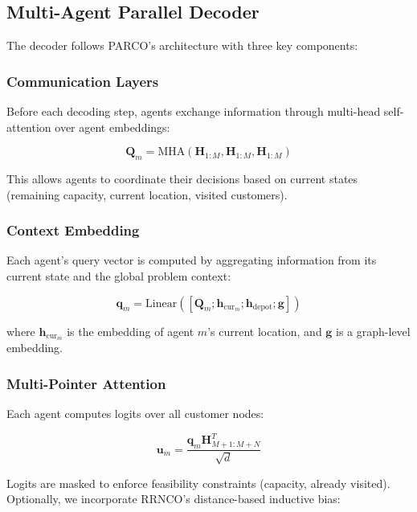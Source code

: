 \documentclass[lettersize,journal]{IEEEtran}
\begin{document}
\subsection{Multi-Agent Parallel Decoder}

The decoder follows PARCO's architecture with three key components:

\subsubsection{Communication Layers}

Before each decoding step, agents exchange information through multi-head self-attention over agent embeddings:

\begin{equation}
\mathbf{Q}_m = \text{MHA}(\mathbf{H}_{1:M}, \mathbf{H}_{1:M}, \mathbf{H}_{1:M})
\end{equation}

This allows agents to coordinate their decisions based on current states (remaining capacity, current location, visited customers).

\subsubsection{Context Embedding}

Each agent's query vector is computed by aggregating information from its current state and the global problem context:

\begin{equation}
\mathbf{q}_m = \text{Linear}([\mathbf{Q}_m; \mathbf{h}_{\text{cur}_m}; \mathbf{h}_{\text{depot}}; \mathbf{g}])
\end{equation}

where $\mathbf{h}_{\text{cur}_m}$ is the embedding of agent $m$'s current location, and $\mathbf{g}$ is a graph-level embedding.

\subsubsection{Multi-Pointer Attention}

Each agent computes logits over all customer nodes:

\begin{equation}
\mathbf{u}_m = \frac{\mathbf{q}_m \mathbf{H}_{M+1:M+N}^T}{\sqrt{d}}
\end{equation}

Logits are masked to enforce feasibility constraints (capacity, already visited). Optionally, we incorporate RRNCO's distance-based inductive bias:
\end{document}
